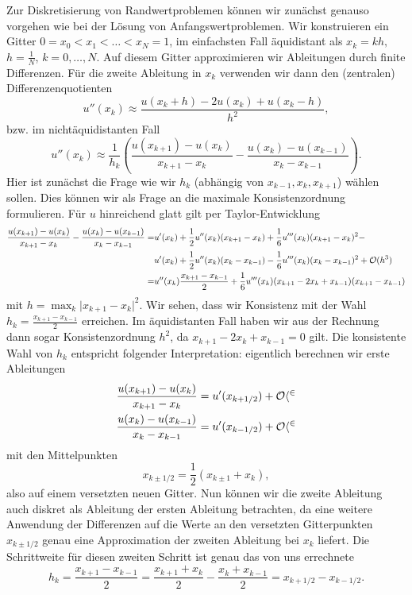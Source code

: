 Zur Diskretisierung von Randwertproblemen k\"onnen wir zun\"achst genauso vorgehen wie bei der L\"osung von Anfangswertproblemen. Wir konstruieren ein Gitter $0=x_0 < x_1 < \ldots < x_N =1$, im einfachsten Fall \"aquidistant als $x_k = kh,$ $h=\frac{1}N$, $k=0,\ldots,N$. Auf diesem Gitter approximieren wir Ableitungen durch finite Differenzen. F\"ur die zweite Ableitung in $x_k$ verwenden wir dann den (zentralen) Differenzenquotienten 
$$ u''(x_k) \approx \frac{u(x_k+h) - 2 u(x_k) + u(x_{k}-h)}{h^2}, $$
bzw. im nichtäquidistanten Fall
$$ u''(x_k) \approx \frac{1}{h_k} \left( \frac{u(x_{k+1}) -  u(x_k)}{x_{k+1}-x_k} -\frac{u(x_k)- u(x_{k-1})}{x_k - x_{k-1}} \right).$$
Hier ist zun\"achst die Frage wie wir $h_k$ (abh\"angig von $x_{k-1}, x_k, x_{k+1}$) w\"ahlen sollen. Dies k\"onnen wir als Frage an die maximale Konsistenzordnung formulieren. F\"ur $u$ hinreichend glatt gilt per Taylor-Entwicklung
\begin{align*}
	\frac{u(x_{k+1}) -  u(x_k)}{x_{k+1}-x_k} -\frac{u(x_k)- u(x_{k-1})}{x_k - x_{k-1}}  =& u'(x_k) + \frac{1}2 u''(x_k) (x_{k+1} -x_k)  +  \frac{1}6 u'''(x_k) (x_{k+1} -x_k)^2  - \\ &u'(x_k) + \frac{1}2 u''(x_k) (x_k-x_{k-1})  -  \frac{1}6 u'''(x_k) (x_k-x_{k-1})^2 
	+ {\cal O}(h^3)\\
	=& u''(x_k) \frac{ x_{k+1}-x_{k-1}}2 +   \frac{1}6 u'''(x_k) (x_{k+1} -2 x_k +x_{k-1})( x_{k+1}-x_{k-1} )
\end{align*}
mit $h = \max_k \vert x_{k+1} -x_k\vert^2$.
Wir sehen, dass wir Konsistenz   mit der Wahl $h_k=\frac{x_{k+1}-x_{k-1}}2$ erreichen. Im \"aquidistanten Fall haben wir aus der Rechnung dann sogar Konsistenzordnung $h^2$, da $x_{k+1} -2 x_k +x_{k-1} = 0$ gilt. Die konsistente Wahl von $h_k$ entspricht folgender Interpretation: eigentlich berechnen wir erste Ableitungen
\begin{align*}
	\frac{u(x_{k+1}) -  u(x_k)}{x_{k+1}-x_k} &= u'(x_{k+1/2}) + \cal O{h^2} \\
	\frac{u(x_k)- u(x_{k-1})}{x_k - x_{k-1}} &= u'(x_{k-1/2}) + \cal O{h^2}
\end{align*}
mit den Mittelpunkten
$$ x_{k\pm1/2} = \frac{1}2 (x_{k\pm 1} + x_k), $$
also auf einem versetzten neuen Gitter. Nun k\"onnen wir die zweite Ableitung auch diskret als Ableitung der ersten Ableitung betrachten, da eine weitere Anwendung der Differenzen auf die Werte an den versetzten Gitterpunkten $x_{k\pm1/2}$ genau eine Approximation der zweiten Ableitung bei $x_k$ liefert. Die Schrittweite f\"ur diesen zweiten Schritt ist genau das von uns errechnete 
$$h_k = \frac{x_{k+1} - x_{k-1}}2 =\frac{x_{k+1}+x_k}2 - \frac{x_k+x_{k-1}}2 = x_{k+1/2} - x_{k-1/2}.$$

